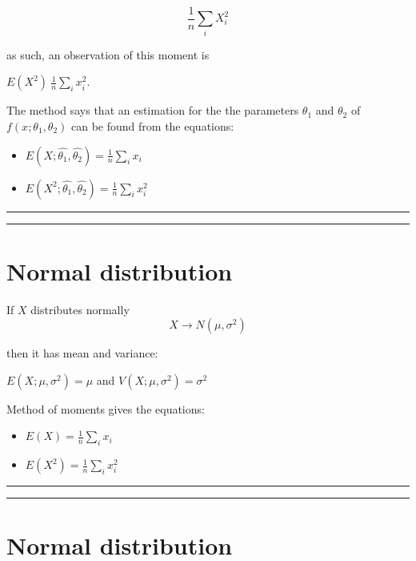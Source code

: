 \documentclass[
]{book}
\providecommand{\tightlist}{%
  \setlength{\itemsep}{0pt}\setlength{\parskip}{0pt}}
\begin{document}
\[\frac{1}{n}\sum_i X^2_i\]

as such, an observation of this moment is

\(E(X ^ 2)~\frac{1}{n}\sum_i x^2_i\).

The method says that an estimation for the the parameters \(\theta_1\) and \(\theta_2\) of \(f(x;\theta_1,\theta_2)\) can be found from the equations:

\begin{itemize}
\item
  \(E(X; \hat{\theta_1}, \hat{\theta_2})= \frac{1}{n}\sum_i x_i\)
\item
  \(E(X^2; \hat{\theta_1}, \hat{\theta_2})=\frac{1}{n}\sum_i x^2_i\)
\end{itemize}

\begin{center}\rule{0.5\linewidth}{0.5pt}\end{center}

\begin{center}\rule{0.5\linewidth}{0.5pt}\end{center}

\hypertarget{normal-distribution-13}{%
\section{Normal distribution}\label{normal-distribution-13}}

If \(X\) distributes normally\\
\[X \rightarrow N(\mu, \sigma^2)\]

then it has mean and variance:

\(E(X; \mu, \sigma^2)=\mu\) and
\(V(X; \mu, \sigma^2)=\sigma^2\)

Method of moments gives the equations:

\begin{itemize}
\tightlist
\item
  \(E(X)=\frac{1}{n}\sum_i x_i\)
\item
  \(E(X^2)=\frac{1}{n}\sum_i x^2_i\)
\end{itemize}

\begin{center}\rule{0.5\linewidth}{0.5pt}\end{center}

\begin{center}\rule{0.5\linewidth}{0.5pt}\end{center}

\hypertarget{normal-distribution-14}{%
\section{Normal distribution}\label{normal-distribution-14}}
\end{document}
